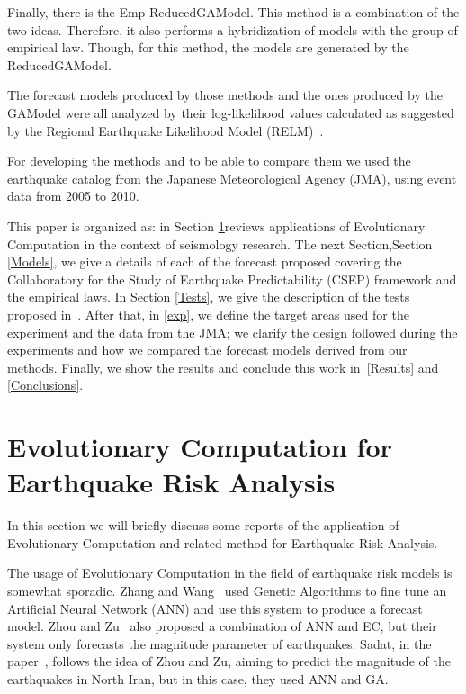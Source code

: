 Finally, there is the Emp-ReducedGAModel. This method is a combination
of the two ideas. Therefore, it also performs a hybridization of
models with the group of empirical law. Though, for this method, the
models are generated by the ReducedGAModel.

The forecast models produced by those methods and the ones produced by
the GAModel were all analyzed by their log-likelihood values calculated as suggested by the Regional Earthquake
Likelihood Model (RELM)~\cite{schorlemmer2007earthquake}.

For developing the methods and to be able to compare them we used the
earthquake catalog from the Japanese Meteorological Agency (JMA),
using event data from 2005 to 2010. 

This paper is organized as: in Section \ref{estadoArte}reviews
applications of Evolutionary Computation in the context of seismology
research. The next Section,Section \ref{Models}, we give a details of
each of the forecast proposed covering the Collaboratory for the Study
of Earthquake Predictability (CSEP) framework and the empirical
laws. In Section \ref{Tests}, we give the description of the tests
proposed in~\cite{Schorlemmer2007}. After that, in \ref{exp}, we
define the target areas used for the experiment and the data from the
JMA; we clarify the design followed during the experiments and how we
compared the forecast models derived from our methods. Finally, we
show the results and conclude this work in~\ref{Results} and
\ref{Conclusions}.

\section{Evolutionary Computation for Earthquake Risk Analysis}\label{estadoArte}
In this section we will briefly discuss some reports of the
application of Evolutionary Computation and related method for
Earthquake Risk Analysis.

The usage of Evolutionary Computation in the field of earthquake risk
models is somewhat sporadic. Zhang and Wang~\cite{Zhang2012} used
Genetic Algorithms to fine tune an Artificial Neural Network (ANN) and
use this system to produce a forecast model. Zhou and
Zu~\cite{Feiyan2014} also proposed a combination of ANN and EC, but
their system only forecasts the magnitude parameter of
earthquakes. Sadat, in the paper~\cite{sadat2015application}, follows
the idea of Zhou and Zu, aiming to predict the magnitude of the
earthquakes in North Iran, but in this case, they used ANN and GA.

